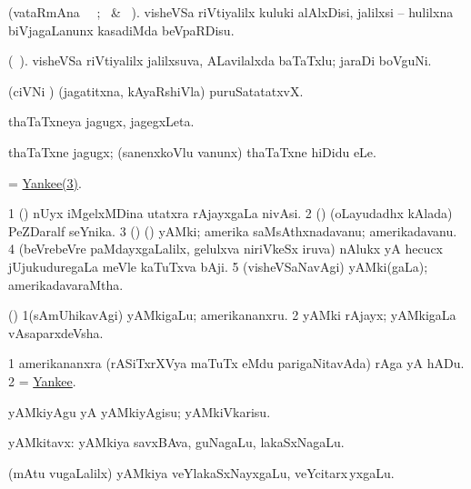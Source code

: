 \bentry
{} 
\gl{\sakirx} 
\bmng
(vataRmAna  \parxpu\  \Eva\ ; \BU\ \& \BUkaq\ ). 
visheVSa riVtiyalilx kuluki alAlxDisi, jalilxsi -- hulilxna biVjagaLanunx kasadiMda beVpaRDisu.
\emng
\eentry

\bentry
{} 
\gl{\nA}  
\bmng
(\bava\ ).
visheVSa riVtiyalilx jalilxsuva, ALavilalxda baTaTxlu; jaraDi boVguNi.
\emng
\eentry

\bentry
{}  
\gl{\nA} 
\bmng
(ciVNi \tashA) (jagatitxna, kAyaRshiVla) puruSatatatxvX.
\emng 
\eentry

\bentry
{} 
\gl{\nA} 
\bmng
thaTaTxneya jagugx, jagegxLeta.
\emng
\eentry

\bentry
{} 
\gl{\sakirx} 
\bmng
thaTaTxne jagugx; (sanenxkoVlu \mo vanunx) thaTaTxne hiDidu eLe.
\emng
\eentry

\bentry
{} 
\gl{\nA}
\bmng
= \hyperlink{Yankee(3)}{Yankee(3)}.
\emng
\eentry

\bentry
{} 
\gl{\nA} 
\bmng
\bnum
\num{1} (\ame) nUyx iMgelxMDina utatxra rAjayxgaLa nivAsi. 
\num{2} (\ca) (oLayudadhx kAlada) PeZDaralf seYnika. 
\hypertarget{Yankee(3)}{}
\num{3} (\AmA) (\hiV) yAMki;  amerika saMsAthxnadavanu; amerikadavanu. 
\num{4} (beVrebeVre paMdayxgaLalilx, gelulxva niriVkeSx iruva) nAlukx  yA hecucx jUjukuduregaLa meVle kaTuTxva bAji. 
\num{5} (visheVSaNavAgi) yAMki(gaLa); amerikadavaraMtha.
\enum
\emng 
\eentry

\bentry
{} 
\gl{\nA}  
\bmng
(\AmA)
\bnum 
\num{1}(sAmUhikavAgi) yAMkigaLu; amerikananxru. 
\num{2} yAMki rAjayx; yAMkigaLa vAsaparxdeVsha.
\enum
\emng 
\eentry

\bentry
{} 
\gl{\nA} 
\bmng
\bnum
\num{1} amerikananxra (rASiTxrXVya maTuTx eMdu parigaNitavAda) rAga yA hADu.
\num{2} = \hyperlink{Yankee}{Yankee}.
\enum
\emng
\eentry

\bentry
{} 
\gl{\sakirx} 
\bmng
yAMkiyAgu yA yAMkiyAgisu; yAMkiVkarisu.
\emng
\eentry

\bentry
{} 
\gl{\nA} 
\bmng
yAMkitavx:
\banum
{}  yAMkiya  savxBAva, guNagaLu, lakaSxNagaLu. 

 (mAtu \mo vugaLalilx) yAMkiya veYlakaSxNayxgaLu, veYcitarx\,yxgaLu. 

